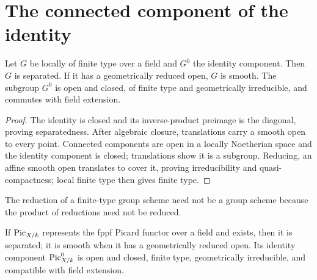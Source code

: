 \section{The connected component of the identity}\label{kps-sec-pic0}

\begin{lemma}\label{kps-lem-group-scheme}
Let $G$ be locally of finite type over a field and $G^0$ the identity
component. Then $G$ is separated. If it has a geometrically reduced open,
$G$ is smooth. The subgroup $G^0$ is open and closed, of finite type and
geometrically irreducible, and commutes with field extension.
\end{lemma}
\begin{proof}
The identity is closed and its inverse-product preimage is the diagonal, proving
separatedness. After algebraic closure, translations carry a smooth open to
every point. Connected components are open in a locally Noetherian space and
the identity component is closed; translations show it is a subgroup. Reducing,
an affine smooth open translates to cover it, proving irreducibility and
quasi-compactness; local finite type then gives finite type.
\end{proof}

\begin{remark}\label{kps-rmk-reduction}
The reduction of a finite-type group scheme need not be a group scheme because
the product of reductions need not be reduced.
\end{remark}

\begin{proposition}\label{kps-prop-pic0}
If $\operatorname{Pic}_{X/k}$ represents the fppf Picard functor over a field and exists,
then it is separated; it is smooth when it has a geometrically reduced open.
Its identity component $\operatorname{Pic}^0_{X/k}$ is open and closed, finite type,
geometrically irreducible, and compatible with field extension.
\end{proposition}

